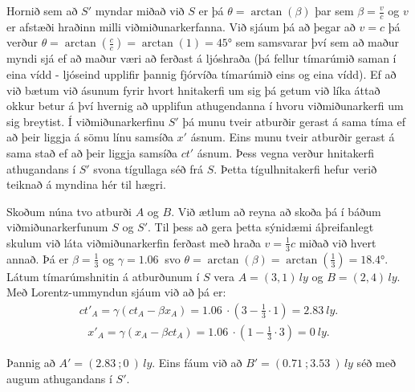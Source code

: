 \begin{minipage}{\linewidth}
\vspace{0.2cm}

Hornið sem að $S'$ myndar miðað við $S$ er þá $\theta = \arctan(\beta)$ þar sem $\beta = \frac{v}{c}$ og $v$ er afstæði hraðinn milli viðmiðunarkerfanna. Við sjáum þá að þegar að $v = c$ þá verður $\theta = \arctan(\frac{c}{c}) =  \arctan(1) = \ang{45}$ sem samsvarar því sem að maður myndi sjá ef að maður væri að ferðast á ljóshraða (þá fellur tímarúmið saman í eina vídd - ljóseind upplifir þannig fjórvíða tímarúmið eins og eina vídd). Ef að við bætum við ásunum fyrir hvort hnitakerfi um sig þá getum við líka áttað okkur betur á því hvernig að upplifun athugendanna í hvoru viðmiðunarkerfi um sig breytist. Í viðmiðunarkerfinu $S'$ þá munu tveir atburðir gerast á sama tíma ef að þeir liggja á sömu línu samsíða $x'$ ásnum. Eins munu tveir atburðir gerast á sama stað ef að þeir liggja samsíða $ct'$ ásnum. Þess vegna verður hnitakerfi athugandans í $S'$ svona tígullaga séð frá $S$. Þetta tígulhnitakerfi hefur verið teiknað á myndina hér til hægri.

\vspace{0.3cm}

Skoðum núna tvo atburði $A$ og $B$. Við ætlum að reyna að skoða þá í báðum viðmiðunarkerfunum $S$ og $S'$. Til þess að gera þetta sýnidæmi áþreifanlegt skulum við láta viðmiðunarkerfin ferðast með hraða $v = \frac{1}{3}c$ miðað við hvert annað. Þá er $\beta = \frac{1}{3}$ og $\gamma = \SI{1.06}{}$ svo $\theta = \arctan(\beta) = \arctan(\frac{1}{3}) = \ang{18.4} $. Látum tímarúmshnitin á atburðunum í $S$ vera $A = (3,1) \, \si{ly}$ og $B = (2,4) \, \si{ly}$. Með Lorentz-ummyndun sjáum við að þá er:
\begin{align*}
  ct'_A = \gamma(ct_A - \beta x_A) = \SI{1.06}{} \cdot \left( 3 - \frac{1}{3} \cdot 1 \right) = \SI{2.83}{ly}.
\end{align*}
\begin{align*}
  x'_A = \gamma(x_A -  \beta ct_A) = \SI{1.06}{} \cdot \left( 1 - \frac{1}{3} \cdot 3 \right) = \SI{0}{ly}.
\end{align*}
\end{minipage}

\vspace{0.2cm}
Þannig að $A' = (\SI{2.83}{};\SI{0}{}) \, \si{ly}$. Eins fáum við að $B' = (\SI{0.71}{};\SI{3.53}{}) \, \si{ly}$ séð með augum athugandans í $S'$.

